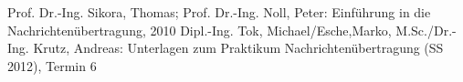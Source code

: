 \begin{thebibliography}{999}




 Prof. Dr.-Ing. Sikora, Thomas; Prof. Dr.-Ing. Noll, Peter: Einführung in die
Nachrichtenübertragung, 2010
 Dipl.-Ing. Tok, Michael/Esche,Marko, M.Sc./Dr.-Ing. Krutz, Andreas: Unterlagen zum Praktikum
Nachrichtenübertragung (SS 2012), Termin 6
\end{thebibliography}


